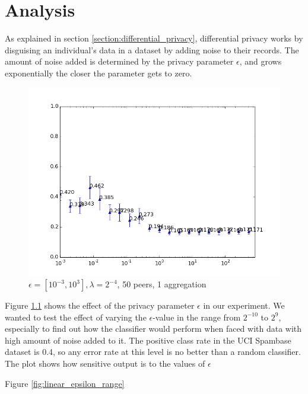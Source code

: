 
\chapter{Analysis}

As explained in section \ref{section:differential_privacy}, differential privacy works by disguising an individual's data in a dataset by adding noise to their records. The amount of noise added is determined by the privacy parameter  $\epsilon$, and grows exponentially the closer the parameter gets to zero. 

\begin{figure}[h!]
	\centering
	\includegraphics[width=\textwidth]{fig/eps2e-10-2e9,bud=eps,peers50,groups50,reg2e-4}
 	\caption{$\epsilon = [10^{-3}, 10^{3}], \lambda = 2^{-4}$, 50 peers, 1 aggregation}
 	\label{fig:epsilon_big_range}
\end{figure}
 
Figure \ref{fig:epsilon_big_range} shows the effect of the privacy parameter $\epsilon$ in our experiment. We wanted to test the effect of varying the $\epsilon$-value in the range from $2^{-10}$ to $2^9$, especially to find out how the classifier would perform when faced with data with high amount of noise added to it. The positive class rate in the UCI Spambase dataset is 0.4, so any error rate at this level is no better than a random classifier. The plot shows how sensitive output is to the values of $\epsilon$

Figure \ref{fig:linear_epsilon_range} 


